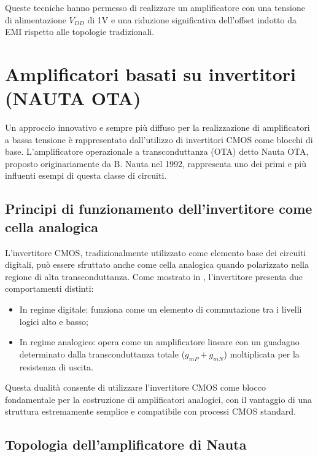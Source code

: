 Queste tecniche hanno permesso di realizzare un amplificatore con una tensione di alimentazione $V_{DD}$ di 1V e una riduzione significativa dell'offset indotto da EMI rispetto alle topologie tradizionali.

\section{Amplificatori basati su invertitori (NAUTA OTA)}

Un approccio innovativo e sempre più diffuso per la realizzazione di amplificatori a bassa tensione è rappresentato dall'utilizzo di invertitori CMOS come blocchi di base. L'amplificatore operazionale a transconduttanza (OTA) detto Nauta OTA, proposto originariamente da B. Nauta nel 1992, rappresenta uno dei primi e più influenti esempi di questa classe di circuiti.

\subsection{Principi di funzionamento dell'invertitore come cella analogica}

L'invertitore CMOS, tradizionalmente utilizzato come elemento base dei circuiti digitali, può essere sfruttato anche come cella analogica quando polarizzato nella regione di alta transconduttanza. Come mostrato in \cite{EMI_Immunity_of_the_Nauta_Inverter-Based_Amplifier}, l'invertitore presenta due comportamenti distinti:

\begin{itemize}
   \item In regime digitale: funziona come un elemento di commutazione tra i livelli logici alto e basso;
   \item In regime analogico: opera come un amplificatore lineare con un guadagno determinato dalla transconduttanza totale ($g_{mP} + g_{mN}$) moltiplicata per la resistenza di uscita.
\end{itemize}

Questa dualità consente di utilizzare l'invertitore CMOS come blocco fondamentale per la costruzione di amplificatori analogici, con il vantaggio di una struttura estremamente semplice e compatibile con processi CMOS standard.

\subsection{Topologia dell'amplificatore di Nauta}

